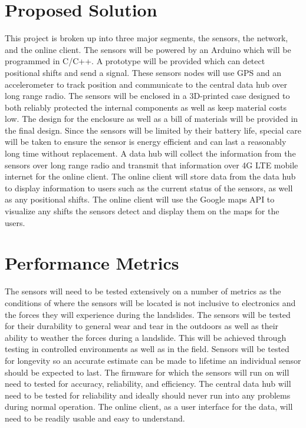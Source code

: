\documentclass[draftclsnofoot,onecolumn, 10pt]{IEEEtran}
\begin{document}
	\section{Proposed Solution}
	This project is broken up into three major segments, the sensors, the network, and the online client. The sensors will be powered by an Arduino which will be programmed in C/C++. A prototype will be provided which can detect positional shifts and send a signal. These sensors nodes will use GPS and an accelerometer to track position and communicate to the central data hub over long range radio. The sensors will be enclosed in a 3D-printed case designed to both reliably protected the internal components as well as keep material costs low. The design for the enclosure as well as a bill of materials will be provided in the final design. Since the sensors will be limited by their battery life, special care will be taken to ensure the sensor is energy efficient and can last a reasonably long time without replacement. A data hub will collect the information from the sensors over long range radio and transmit that information over 4G LTE mobile internet for the online client. The online client will store data from the data hub to display information to users such as the current status of the sensors, as well as any positional shifts. The online client will use the Google maps API to visualize any shifts the sensors detect and display them on the maps for the users.
	
	
	\section{Performance Metrics}
	The sensors will need to be tested extensively on a number of metrics as the conditions of where the sensors will be located is not inclusive to electronics and the forces they will experience during the landslides. The sensors will be tested for their durability to general wear and tear in the outdoors as well as their ability to weather the forces during a landslide. This will be achieved through testing in controlled environments as well as in the field. Sensors will be tested for longevity so an accurate estimate can be made to lifetime an individual sensor should be expected to last. The firmware for which the sensors will run on will need to tested for accuracy, reliability, and efficiency. The central data hub will need to be tested for reliability and ideally should never run into any problems during normal operation. The online client, as a user interface for the data, will need to be readily usable and easy to understand. 
	
	
\end{document}
